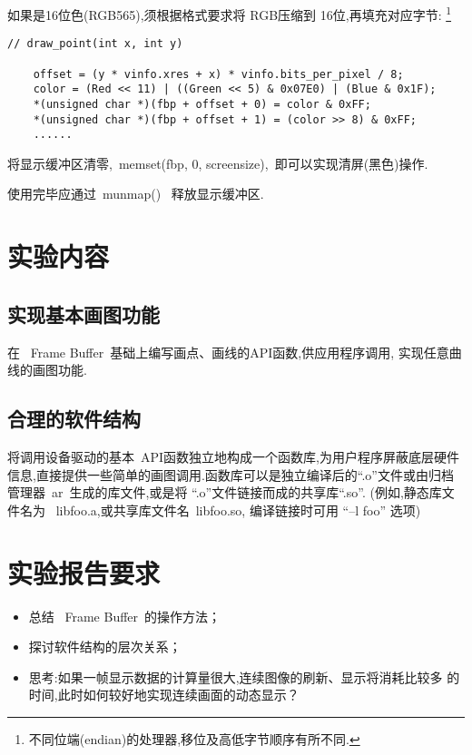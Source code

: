 	如果是16位色(RGB565),须根据格式要求将 RGB压缩到 16位,再填充对应字节:
\footnote{不同位端(endian)的处理器,移位及高低字节顺序有所不同.}

\begin{boxedminipage}{.9\textwidth}
\begin{verbatim}
// draw_point(int x, int y)

    offset = (y * vinfo.xres + x) * vinfo.bits_per_pixel / 8;
    color = (Red << 11) | ((Green << 5) & 0x07E0) | (Blue & 0x1F);
    *(unsigned char *)(fbp + offset + 0) = color & 0xFF;
    *(unsigned char *)(fbp + offset + 1) = (color >> 8) & 0xFF;
    ......
\end{verbatim}
\end{boxedminipage}

	将显示缓冲区清零,~memset(fbp, 0, screensize),~即可以实现清屏(黑色)操作.

使用完毕应通过~munmap()~ 释放显示缓冲区.
\section{实验内容}
\subsection{实现基本画图功能}
	在 ~Frame Buffer~基础上编写画点、画线的API函数,供应用程序调用,
实现任意曲线的画图功能.

\subsection{合理的软件结构}
    将调用设备驱动的基本~API函数独立地构成一个函数库,为用户程序屏蔽底层硬件
信息,直接提供一些简单的画图调用.函数库可以是独立编译后的``.o''文件或由归档
管理器~ar~生成的库文件,或是将 ``.o''文件链接而成的共享库``.so''.
(例如,静态库文件名为 ~libfoo.a,或共享库文件名~libfoo.so, 编译链接时可用
``--l foo'' 选项)

\section{实验报告要求}
\begin{itemize}\itemsep=-3pt
  \item 总结 ~Frame Buffer~的操作方法；
  \item 探讨软件结构的层次关系；
  \item 思考:如果一帧显示数据的计算量很大,连续图像的刷新、显示将消耗比较多
		的时间,此时如何较好地实现连续画面的动态显示？
\end{itemize}
